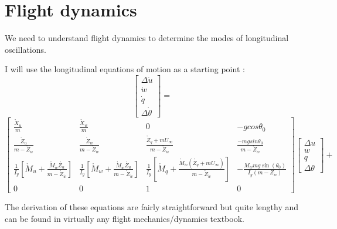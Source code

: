 \documentclass[
11pt, %
english, %
singlespacing, %
headsepline, %
] %
{MastersDoctoralThesis}
\begin{document}
\section{Flight dynamics}

We need to understand flight dynamics to determine the modes of longitudinal oscillations. 

I will use the longitudinal equations of motion as a starting point \cite{etkin}:
$$\begin{bmatrix}\Delta\dot{u}\\\dot{w}\\\dot{q}\\\Delta\dot{\theta}\end{bmatrix} =$$
$$ \begin{bmatrix}\frac{\mathring{X}_{u}}{m}&\frac{\mathring{X}_{w}}{m}&0&-gcos\theta_{0}\\\frac{\mathring{Z}_{u}}{m-\mathring{Z}_{\dot{w}}}&\frac{\mathring{Z}_{w}}{m-\mathring{Z}_{\dot{w}}}&\frac{\mathring{Z}_{q}+mU_{\infty}}{m-\mathring{Z}_{\dot{w}}}&\frac{-mgsin\theta_{0}}{m-\mathring{Z}_{\dot{w}}}\\\frac{1}{I_{y}}\left[\mathring{M}_{u}+\frac{\mathring{M}_{\dot{w}}\mathring{Z_{u}}}{m-\mathring{Z}_{\dot{w}}}\right]&\frac{1}{I_{y}}\left[\mathring{M}_{w}+\frac{\mathring{M}_{\dot{w}}\mathring{Z_{u}}}{m-\mathring{Z}_{\dot{w}}}\right]&\frac{1}{I_{y}}\left[\mathring{M}_{q}+\frac{\mathring{M}_{\dot{w}}(\mathring{Z_{q}}+mU_{\infty})}{m-\mathring{Z}_{\dot{w}}}\right]&-\frac{M_{\dot{w}}mg\sin(\theta_{0})}{I_{y}(m-Z_{\dot{w}})}\\0&0&1&0\end{bmatrix}\begin{bmatrix}\Delta u\\w\\q\\\Delta\theta\end{bmatrix}+$$ 

The derivation of these equations are fairly straightforward but quite lengthy and can be found in virtually any flight mechanics/dynamics textbook. 


\thispagestyle{fancy}
\end{document}
